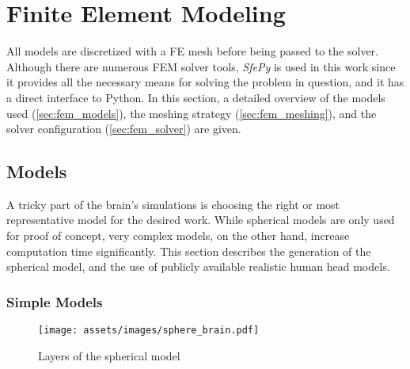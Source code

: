 \pagebreak
\chapter{Finite Element Modeling}

All models are discretized with a \gls{FE} mesh before being passed to the solver. Although there are numerous \gls{FEM} solver tools, \textit{SfePy} is used in this work \cite{Cimrman2019} since it provides all the necessary means for solving the problem in question, and it has a direct interface to Python. In this section, a detailed overview of the models used (\autoref{sec:fem_models}), the meshing strategy (\autoref{sec:fem_meshing}), and the solver configuration (\autoref{sec:fem_solver}) are given.

\section{Models}
\label{sec:fem_models}

A tricky part of the brain's simulations is choosing the right or most representative model for the desired work. While spherical models are only used for proof of concept, very complex models, on the other hand, increase computation time significantly. This section describes the generation of the spherical model, and the use of publicly available realistic human head models.

\subsection{Simple Models}
\begin{wrapfigure}{r}{0.35\textwidth}
    \centering
    \texttt{[image: assets/images/sphere\_brain.pdf]}
    \caption{Layers of the spherical model}
    \vspace{-4cm}
    \label{fig:sphere_brain}
\end{wrapfigure}

